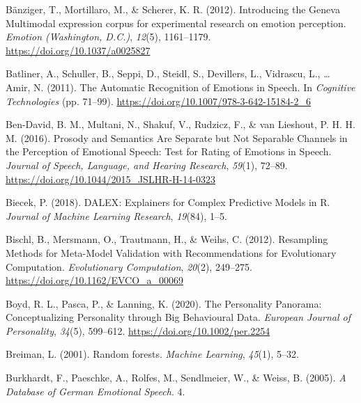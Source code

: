 \documentclass[
  man,floatsintext]{apa6}
\newlength{\cslhangindent}
\newlength{\cslentryspacingunit} %
\newenvironment{CSLReferences}[2] %
 {%
  \setlength{\parindent}{0pt}
  \ifodd #1
  \let\oldpar\par
  \def\par{\hangindent=\cslhangindent\oldpar}
  \fi
  \setlength{\parskip}{#2\cslentryspacingunit}
 }%
 {}
\begin{document}
\hypertarget{refs}{}
\begin{CSLReferences}{1}{0}
\leavevmode{}%
Bänziger, T., Mortillaro, M., \& Scherer, K. R. (2012). Introducing the {Geneva Multimodal} expression corpus for experimental research on emotion perception. \emph{Emotion (Washington, D.C.)}, \emph{12}(5), 1161--1179. \url{https://doi.org/10.1037/a0025827}

\leavevmode{}%
Batliner, A., Schuller, B., Seppi, D., Steidl, S., Devillers, L., Vidrascu, L., \ldots{} Amir, N. (2011). The {Automatic Recognition} of {Emotions} in {Speech}. In \emph{Cognitive {Technologies}} (pp. 71--99). \url{https://doi.org/10.1007/978-3-642-15184-2_6}

\leavevmode{}%
Ben-David, B. M., Multani, N., Shakuf, V., Rudzicz, F., \& van Lieshout, P. H. H. M. (2016). Prosody and {Semantics Are Separate} but {Not Separable Channels} in the {Perception} of {Emotional Speech}: {Test} for {Rating} of {Emotions} in {Speech}. \emph{Journal of Speech, Language, and Hearing Research}, \emph{59}(1), 72--89. \url{https://doi.org/10.1044/2015_JSLHR-H-14-0323}

\leavevmode{}%
Biecek, P. (2018). {DALEX}: {Explainers} for {Complex Predictive Models} in {R}. \emph{Journal of Machine Learning Research}, \emph{19}(84), 1--5.

\leavevmode{}%
Bischl, B., Mersmann, O., Trautmann, H., \& Weihs, C. (2012). Resampling {Methods} for {Meta-Model Validation} with {Recommendations} for {Evolutionary Computation}. \emph{Evolutionary Computation}, \emph{20}(2), 249--275. \url{https://doi.org/10.1162/EVCO_a_00069}

\leavevmode{}%
Boyd, R. L., Pasca, P., \& Lanning, K. (2020). The {Personality Panorama}: {Conceptualizing Personality} through {Big Behavioural Data}. \emph{European Journal of Personality}, \emph{34}(5), 599--612. \url{https://doi.org/10.1002/per.2254}

\leavevmode{}%
Breiman, L. (2001). Random forests. \emph{Machine Learning}, \emph{45}(1), 5--32.

\leavevmode{}%
Burkhardt, F., Paeschke, A., Rolfes, M., Sendlmeier, W., \& Weiss, B. (2005). \emph{A {Database} of {German Emotional Speech}}. 4.


\end{CSLReferences}
\end{document}
